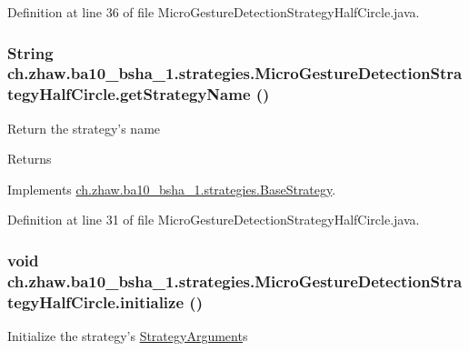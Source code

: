 Definition at line 36 of file MicroGestureDetectionStrategyHalfCircle.java.\hypertarget{classch_1_1zhaw_1_1ba10__bsha__1_1_1strategies_1_1MicroGestureDetectionStrategyHalfCircle_ab8f20632c110877b3173a3ca6c673bc1}{
\subsubsection[{getStrategyName}]{\setlength{\rightskip}{0pt plus 5cm}String ch.zhaw.ba10\_\-bsha\_\-1.strategies.MicroGestureDetectionStrategyHalfCircle.getStrategyName ()}}
\label{classch_1_1zhaw_1_1ba10__bsha__1_1_1strategies_1_1MicroGestureDetectionStrategyHalfCircle_ab8f20632c110877b3173a3ca6c673bc1}
Return the strategy's name

\begin{DoxyReturn}{Returns}

\end{DoxyReturn}


Implements \hyperlink{classch_1_1zhaw_1_1ba10__bsha__1_1_1strategies_1_1BaseStrategy_aa0ebed55eed45409bad13d43a0058780}{ch.zhaw.ba10\_\-bsha\_\-1.strategies.BaseStrategy}.

Definition at line 31 of file MicroGestureDetectionStrategyHalfCircle.java.\hypertarget{classch_1_1zhaw_1_1ba10__bsha__1_1_1strategies_1_1MicroGestureDetectionStrategyHalfCircle_a7f8d7d1b4c366aa2bcb4eade7db4af8f}{
\subsubsection[{initialize}]{\setlength{\rightskip}{0pt plus 5cm}void ch.zhaw.ba10\_\-bsha\_\-1.strategies.MicroGestureDetectionStrategyHalfCircle.initialize ()}}
\label{classch_1_1zhaw_1_1ba10__bsha__1_1_1strategies_1_1MicroGestureDetectionStrategyHalfCircle_a7f8d7d1b4c366aa2bcb4eade7db4af8f}
Initialize the strategy's \hyperlink{classch_1_1zhaw_1_1ba10__bsha__1_1_1StrategyArgument}{StrategyArgument}s 

